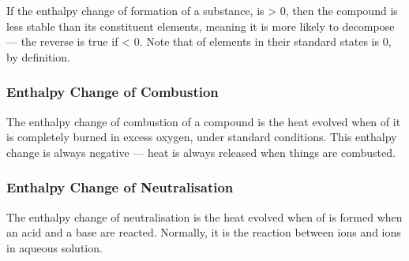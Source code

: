 
				If the enthalpy change of formation of a substance,  is > 0, then the compound is less stable than its constituent elements,
				meaning it is more likely to decompose --- the reverse is true if  < 0. Note that  of elements in their standard
				states is 0, by definition.


			\subsubsection{Enthalpy Change of Combustion}
				The enthalpy change of combustion of a compound is the heat evolved when  of it is completely burned in excess
				oxygen, under standard conditions. This enthalpy change is always negative --- heat is always released when things are combusted.



			\subsubsection{Enthalpy Change of Neutralisation}

				The enthalpy change of neutralisation is the heat evolved when  of  is formed when an acid and a base are
				reacted. Normally, it is the reaction between  ions and  ions in aqueous solution.


